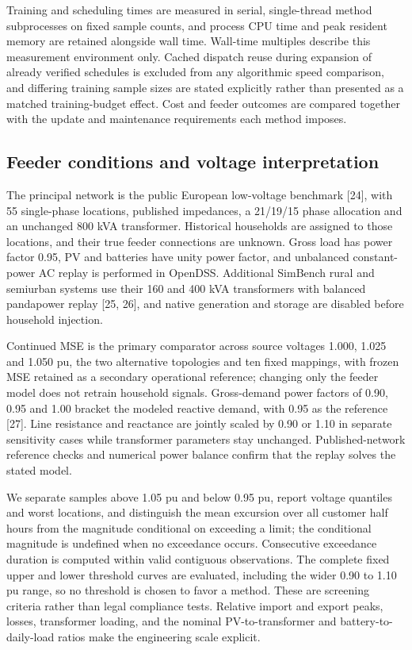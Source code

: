 \documentclass[pdflatex,Numbered,sn-basic]{sn-jnl}
\begin{document}
Training and scheduling times are measured in serial, single-thread method subprocesses on fixed sample counts, and process CPU time and peak resident memory are retained alongside wall time. Wall-time multiples describe this measurement environment only. Cached dispatch reuse during expansion of already verified schedules is excluded from any algorithmic speed comparison, and differing training sample sizes are stated explicitly rather than presented as a matched training-budget effect. Cost and feeder outcomes are compared together with the update and maintenance requirements each method imposes.

\subsection{Feeder conditions and voltage interpretation}

The principal network is the public European low-voltage benchmark [24], with 55 single-phase locations, published impedances, a 21/19/15 phase allocation and an unchanged 800 kVA transformer. Historical households are assigned to those locations, and their true feeder connections are unknown. Gross load has power factor 0.95, PV and batteries have unity power factor, and unbalanced constant-power AC replay is performed in OpenDSS. Additional SimBench rural and semiurban systems use their 160 and 400 kVA transformers with balanced pandapower replay [25, 26], and native generation and storage are disabled before household injection.

Continued MSE is the primary comparator across source voltages 1.000, 1.025 and 1.050 pu, the two alternative topologies and ten fixed mappings, with frozen MSE retained as a secondary operational reference; changing only the feeder model does not retrain household signals. Gross-demand power factors of 0.90, 0.95 and 1.00 bracket the modeled reactive demand, with 0.95 as the reference [27]. Line resistance and reactance are jointly scaled by 0.90 or 1.10 in separate sensitivity cases while transformer parameters stay unchanged. Published-network reference checks and numerical power balance confirm that the replay solves the stated model.

We separate samples above 1.05 pu and below 0.95 pu, report voltage quantiles and worst locations, and distinguish the mean excursion over all customer half hours from the magnitude conditional on exceeding a limit; the conditional magnitude is undefined when no exceedance occurs. Consecutive exceedance duration is computed within valid contiguous observations. The complete fixed upper and lower threshold curves are evaluated, including the wider 0.90 to 1.10 pu range, so no threshold is chosen to favor a method. These are screening criteria rather than legal compliance tests. Relative import and export peaks, losses, transformer loading, and the nominal PV-to-transformer and battery-to-daily-load ratios make the engineering scale explicit.
\end{document}

